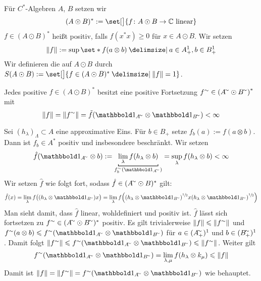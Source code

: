\begin{definition}[{name=[{Zustände auf dem algebraischen Tensorprodukt}]},label=def:116]
	Für $C^*$-Algebren $A$, $B$ setzen wir 
	\[
		(A \odot B)^* := \set[\big]{f \colon A \odot B \to \mathbb{C} \text{ linear}}
	\]
	$f \in (A \odot B)^*$ heißt positiv, falls $f(x^* x)\ge 0$ für $x \in A \odot B$.
	Wir setzen
	\[
		\norm*{f} := \sup \set*{f(a \otimes b) \given a \in A^1_+, b \in B_+^1}
	\]
	Wir definieren die  auf $A \odot B$ durch $S(A \odot B) := \set[\big]{f \in (A \odot B)^* \given \norm*{f}=1}$.
\end{definition}

\begin{proposition}
	Jedes positive $f \in (A \odot B)^*$ besitzt eine positive Fortsetzung $f^\sim \in \enbrace*{A^\simm \odot B^\simm}^*$ mit 
	\[
		\norm*{f}= \norm*{f^\sim} = \tilde{f}(\ind_{A^\simm} \otimes \ind_{B^\simm}) < \infty
	\]
\end{proposition}
\begin{beweis}
	Sei $(h_\lambda)_{\Lambda} \subset A$ eine approximative Eins. 
	Für $b \in B_+$ setze $f_b(a) := f (a \otimes b)$.
	Dann ist $f_b \in A^*$ positiv und insbesondere beschränkt.
	Wir setzen
	\[
		\hat{f} \enbrace*{\ind_{A^\simm} \otimes b} := \Underbracket{\lim_\lambda f(h_\lambda \otimes b)}{f^\sim_b (\ind_{A^\simm})} = \sup_\lambda f(h_\lambda \otimes b) < \infty
	\]
	Wir setzen $\hat{f}$ wie folgt fort, sodass $\hat{f} \in (A^\simm \odot B)^*$ gilt:
	\[
		\hat{f}(x) = \lim_\lambda f \enbrace[\big]{\enbrace*{h_\lambda \otimes  \ind_{B^\simm}} x} = \lim_\lambda f\enbrace*{\enbrace*{h_\lambda \otimes  \ind_{B^\simm}}^{\sfrac{1}{2}} x \enbrace*{h_\lambda \otimes  \ind_{B^\simm}}^{\sfrac{1}{2}}}
	\]
	Man sieht damit, dass $\hat{f}$ linear, wohldefiniert und positiv ist. 
	$\hat{f}$ lässt sich fortsetzen zu $f^\sim \in (A^\simm \odot B^\simm)^*$ positiv.
	Es gilt trivialerweise $\norm*{f} \le \norm*{f^\sim}$ und $f^\sim (a \otimes b) \le f^\sim (\ind_{A^\simm} \otimes \ind_{B^\simm})$ für $a \in (A_+^\simm)^1$ und $b \in (B_+^\simm)^1$.
	Damit folgt $\norm*{f^\sim} \le f^\sim (\ind_{A^\simm} \otimes \ind_{B^\simm}) \le \norm*{f^\sim}$.
	Weiter gilt
	\[
		f^\sim \enbrace*{\ind_{A^\simm} \otimes \ind_{B^\simm}} = \lim_{\lambda,\mu} f \enbrace*{h_\lambda \otimes k_\mu} \le \norm*{f}
	\]
	Damit ist $\norm*{f} = \norm*{f^\sim} = f^\sim \enbrace*{\ind_{A^\simm} \otimes \ind_{B^\simm}}$ wie behauptet.
\end{beweis}

